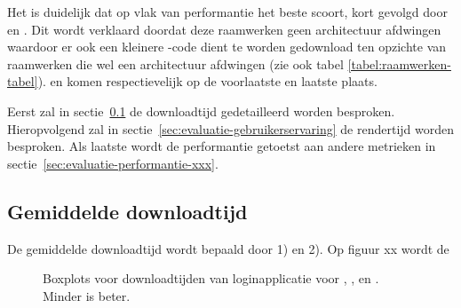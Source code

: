 Het is duidelijk dat op vlak van performantie \lungo{} het beste scoort, kort gevolgd door \jqm{} en \st{}.
Dit wordt verklaard doordat deze raamwerken geen architectuur afdwingen waardoor er ook een kleinere \js{}-code dient te worden gedownload ten opzichte van raamwerken die wel een architectuur afdwingen (zie ook tabel \ref{tabel:raamwerken-tabel}).
\kendo{} en \st{} komen respectievelijk op de voorlaatste en laatste plaats.

Eerst zal in sectie~\ref{sec:evaluatie-downloadtijd} de downloadtijd gedetailleerd worden besproken.
Hieropvolgend zal in sectie~\ref{sec:evaluatie-gebruikerservaring} de rendertijd worden besproken.
Als laatste wordt de performantie getoetst aan andere metrieken in sectie~\ref{sec:evaluatie-performantie-xxx}.


\subsection{Gemiddelde downloadtijd}
\label{sec:evaluatie-downloadtijd}

De gemiddelde downloadtijd wordt bepaald door 1) en 2).
Op figuur xx wordt de 

\begin{figure}
  \centering
  \label{fig:performantie-login-boxplot}
  \caption{Boxplots voor downloadtijden van loginapplicatie voor \st{}, \kendo{},  \jqm{} en \lungo{}. Minder is beter.}
\end{figure}

